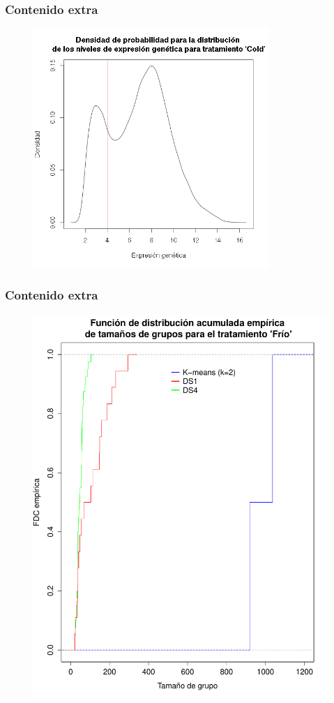 \documentclass[serif,9pt, t]{beamer}
\begin{document}
\begin{frame}\frametitle{Contenido extra}
\begin{figure}
\centering
\includegraphics[width=0.8\textwidth]{extras/densidad_para_niveles}
\end{figure}
\end{frame}

\begin{frame}\frametitle{Contenido extra}
\begin{figure}
\centering
\includegraphics[height=0.8\textheight]{extras/ecdf_k_ds1_ds4.pdf}
\end{figure}
\end{frame}
\end{document}
